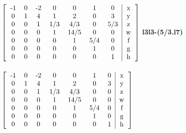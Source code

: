 \documentclass{article}
\begin{document}
\begin{hbox}{

$\left[
\begin{tabular}{ccccccc|c}
-1 & 0 & -2 & 0 & 0 & 1 & 0 & x\\
0 & 1 & 4 & 1 & 2 & 0 & 3 & y\\
0 & 0 & 1 & 1/3 & 4/3 & 0 & 5/3 & z\\
0 & 0 & 0 & 1 & 14/5 & 0 & 0 & w\\
0 & 0 & 0 & 0 & 1 & 5/4 & 0 & f\\
0 & 0 & 0 & 0 & 0 & 1 & 0 & g\\
0 & 0 & 0 & 0 & 0 & 0 & 1 & h\\
\end{tabular}
\right]

$
\textbf{l3\rightarrow l3-(5/3.l7)}
\\\\
$\left[
\begin{tabular}{ccccccc|c}
-1 & 0 & -2 & 0 & 0 & 1 & 0 & x\\
0 & 1 & 4 & 1 & 2 & 0 & 3 & y\\
0 & 0 & 1 & 1/3 & 4/3 & 0 & 0 & z\\
0 & 0 & 0 & 1 & 14/5 & 0 & 0 & w\\
0 & 0 & 0 & 0 & 1 & 5/4 & 0 & f\\
0 & 0 & 0 & 0 & 0 & 1 & 0 & g\\
0 & 0 & 0 & 0 & 0 & 0 & 1 & h\\
\end{tabular}
\right]$}
\end{hbox}
\end{document}
